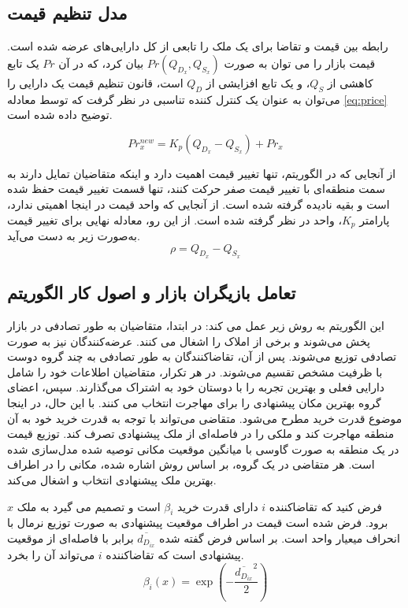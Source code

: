 \subsection{مدل تنظیم قیمت}\label{sec:price_adjustment}

رابطه بین قیمت و تقاضا برای یک ملک را تابعی از کل دارایی‌های عرضه شده است. قیمت بازار را می توان به صورت
$Pr\left(Q_{D_x}, Q_{S_x}\right)$
بیان کرد، که در آن $Pr$ یک تابع کاهشی از $Q_S$، و یک تابع افزایشی از $Q_D$ است، قانون تنظیم قیمت یک دارایی را می‌توان به عنوان یک کنترل کننده تناسبی در نظر گرفت که توسط معادله
\ref{eq:price}
 توضیح داده شده است.
 
 \begin{equation}\label{eq:price}
 	Pr_x^{new} = K_p\left(Q_{D_x} - Q_{S_x}\right) + Pr_x
 \end{equation}

از آنجایی که در الگوریتم، تنها تغییر قیمت اهمیت دارد و اینکه متقاضیان تمایل دارند به سمت منطقه‌ای با تغییر قیمت صفر حرکت کنند، تنها قسمت تغییر قیمت حفظ شده است و بقیه نادیده گرفته شده است. از آنجایی که واحد قیمت در اینجا اهمیتی ندارد، پارامتر $K_p$، واحد در نظر گرفته شده است. از این رو، معادله نهایی برای تغییر قیمت به‌صورت زیر به دست می‌آید.
\begin{equation}
	\rho = Q_{D_x} - Q_{S_x}
\end{equation}



\subsection{تعامل بازیگران بازار و اصول کار الگوریتم}
این الگوریتم به روش زیر عمل می کند: در ابتدا، متقاضیان به طور تصادفی در بازار پخش می‌شوند و برخی از املاک را اشغال می کنند. عرضه‌کنندگان نیز به صورت تصادفی توزیع می‌شوند. پس از آن، تقاضاکنندگان به طور تصادفی به چند گروه دوست با ظرفیت مشخص تقسیم می‌شوند. در هر تکرار، متقاضیان اطلاعات خود را شامل دارایی فعلی و بهترین تجربه را با دوستان خود به اشتراک می‌گذارند. سپس، اعضای گروه بهترین مکان پیشنهادی را برای مهاجرت انتخاب می کنند. با این حال، در اینجا موضوع قدرت خرید مطرح می‌شود. متقاضی می‌تواند با توجه به قدرت خرید خود به آن منطقه مهاجرت کند و ملکی را در فاصله‌ای از ملک پیشنهادی تصرف کند. توزیع قیمت در یک منطقه به صورت گاوسی با میانگین موقعیت مکانی توصیه شده مدل‌سازی شده است. هر متقاضی در یک گروه، بر اساس روش اشاره شده، مکانی را در اطراف بهترین ملک پیشنهادی انتخاب و اشغال می‌کند.

فرض کنید که تقاضاکننده $i$ دارای قدرت خرید $\beta_i$ است و تصمیم می گیرد به ملک $x$ برود. فرض شده است قیمت در اطراف موقعیت پیشنهادی به صورت توزیع نرمال با انحراف میعیار واحد است. بر اساس فرض گفته شده 
$\overline{d_{D_{ix}}}$ 
برابر با فاصله‌ای از موقعیت پیشنهادی است که تقاضاکننده $i$ می‌تواند آن را بخرد.
\begin{equation}
	\beta_i(x) = \exp(-\dfrac{\overline{d_{D_{ix}}}^2}{2})
\end{equation}

